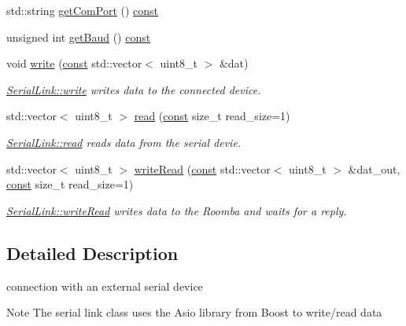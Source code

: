 \begin{DoxyCompactItemize}
std\+::string \hyperlink{class_serial_link_a6c6d0211ec68d41c613d92c27da9679a}{get\+Com\+Port} () \hyperlink{functions__c_8js_afacfd9c985d225bb07483b887a801b6f}{const} 
\item 
unsigned int \hyperlink{class_serial_link_a8611ff8959587b5b629be657f71ac15c}{get\+Baud} () \hyperlink{functions__c_8js_afacfd9c985d225bb07483b887a801b6f}{const} 
\item 
void \hyperlink{class_serial_link_af0e94df5c46bb1b89f2b79eda8312fde}{write} (\hyperlink{functions__c_8js_afacfd9c985d225bb07483b887a801b6f}{const} std\+::vector$<$ uint8\+\_\+t $>$ \&dat)
\begin{DoxyCompactList}\small\item\em \hyperlink{class_serial_link_af0e94df5c46bb1b89f2b79eda8312fde}{Serial\+Link\+::write} writes data to the connected device. \end{DoxyCompactList}\item 
std\+::vector$<$ uint8\+\_\+t $>$ \hyperlink{class_serial_link_a72e3bc4cbecf4909a9df216f4393075a}{read} (\hyperlink{functions__c_8js_afacfd9c985d225bb07483b887a801b6f}{const} size\+\_\+t read\+\_\+size=1)
\begin{DoxyCompactList}\small\item\em \hyperlink{class_serial_link_a72e3bc4cbecf4909a9df216f4393075a}{Serial\+Link\+::read} reads data from the serial devie. \end{DoxyCompactList}\item 
std\+::vector$<$ uint8\+\_\+t $>$ \hyperlink{class_serial_link_a0931b11edd0b82764f1e538ac08b96bb}{write\+Read} (\hyperlink{functions__c_8js_afacfd9c985d225bb07483b887a801b6f}{const} std\+::vector$<$ uint8\+\_\+t $>$ \&dat\+\_\+out, \hyperlink{functions__c_8js_afacfd9c985d225bb07483b887a801b6f}{const} size\+\_\+t read\+\_\+size=1)
\begin{DoxyCompactList}\small\item\em \hyperlink{class_serial_link_a0931b11edd0b82764f1e538ac08b96bb}{Serial\+Link\+::write\+Read} writes data to the Roomba and waits for a reply. \end{DoxyCompactList}\end{DoxyCompactItemize}


\subsection{Detailed Description}
connection with an external serial device \begin{DoxyNote}{Note}
The serial link class uses the Asio library from Boost to write/read data 
\end{DoxyNote}


